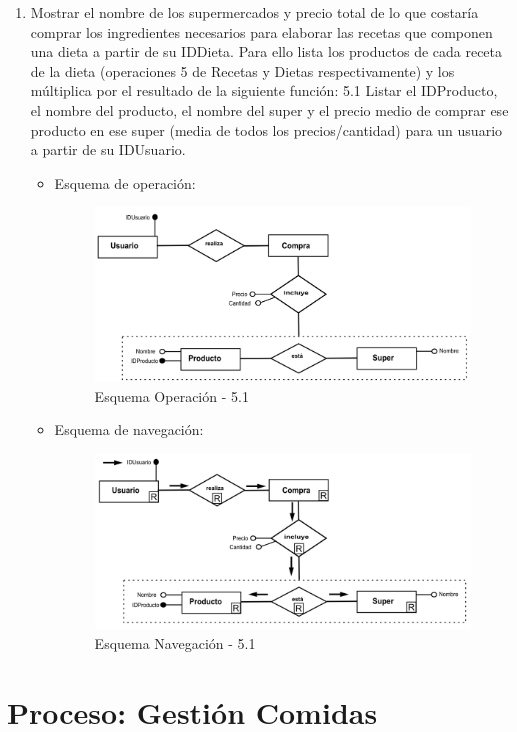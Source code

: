 \documentclass[a4paper,12pt]{report}
\begin{document}
\begin{enumerate}
\item Mostrar el nombre de los supermercados y precio total de lo que
costaría comprar los ingredientes necesarios para elaborar las
recetas que componen una dieta a partir de su IDDieta. Para ello lista los productos de cada receta de la dieta (operaciones 5 de Recetas y Dietas respectivamente) y los múltiplica por el resultado de la siguiente función:
5.1 Listar el IDProducto, el nombre del producto, el nombre del super y el precio medio de comprar ese producto en ese super (media de todos los precios/cantidad) para un usuario a partir de su IDUsuario.
\begin{itemize}
\item Esquema de operación:
\begin{figure}[!htp]
\centering
\includegraphics[width=0.9\linewidth]{./operaciones/img/Estadisticas/51_ope.png}
\caption{Esquema Operación - 5.1}
\label{fig:ope51}
\medskip
\footnotesize
{}
\end{figure}
\item Esquema de navegación:
\begin{figure}[!htp]
\centering
\includegraphics[width=0.9\linewidth]{./operaciones/img/Estadisticas/51_nav.png}
\caption{Esquema Navegación - 5.1}
\label{fig:nave51}
\medskip
\footnotesize
{}
\end{figure}
\end{itemize}
\end{enumerate}
\section{Proceso: Gestión Comidas}
\label{sec-7-7}
\end{document}
